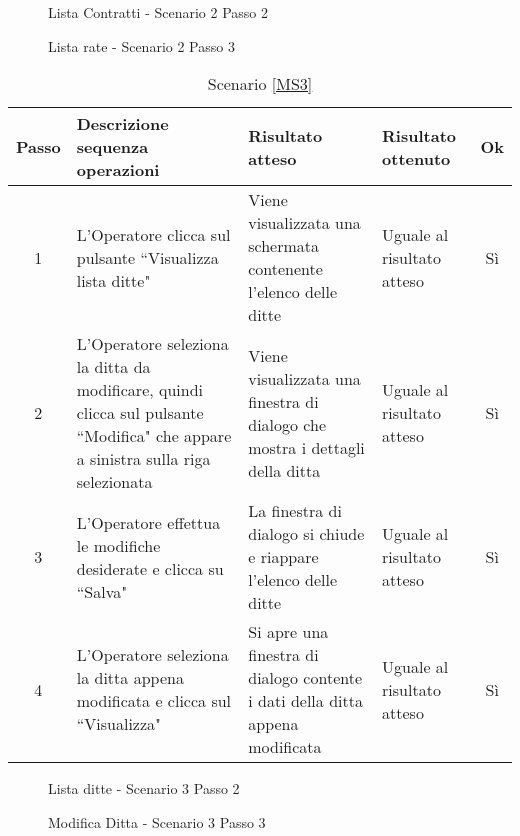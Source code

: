 \begin{figure}[h!]
	\centering
	\caption{Lista Contratti - Scenario 2 Passo 2}
	\label{Lista delle convenzioni/contributi}
\end{figure}

\begin{figure}[h!]
	\centering
	\caption{Lista rate - Scenario 2 Passo 3}
	\label{ListaRate}
\end{figure}





 {
 \footnotesize
  \begin{longtable}{|c|p{3cm}|p{3cm}|p{3cm}|c|}
   \caption{Scenario \ref{MS3}}\\
    \hline
    Passo & Descrizione sequenza operazioni & Risultato atteso & Risultato ottenuto & Ok\\
    \hline
    1 & L'Operatore clicca sul pulsante ``Visualizza lista ditte" & Viene visualizzata una schermata contenente l'elenco delle ditte & Uguale 
      al risultato atteso& Sì\\
    \hline
    2 & L'Operatore seleziona la ditta da modificare, quindi clicca sul pulsante ``Modifica" che appare a sinistra sulla riga selezionata & Viene visualizzata una finestra di dialogo che mostra i dettagli
    della ditta& Uguale al risultato atteso & Sì\\
    \hline
    3 & L'Operatore effettua le modifiche desiderate e clicca su ``Salva"& La finestra di dialogo si chiude e riappare l'elenco delle ditte & Uguale al risultato atteso & Sì\\
    \hline
    4 & L'Operatore seleziona la ditta appena modificata e clicca sul ``Visualizza" & Si apre una finestra di dialogo contente i dati della ditta appena modificata & Uguale al risultato atteso& Sì\\
    \hline
\end{longtable}
}

\begin{figure}[h!]
	\centering
	\caption{Lista ditte - Scenario 3 Passo 2}
	\label{ListaDitte}
\end{figure}

\begin{figure}[h!]
	\centering
	\caption{Modifica Ditta - Scenario 3 Passo 3}
	\label{modificaDitta}
\end{figure}


